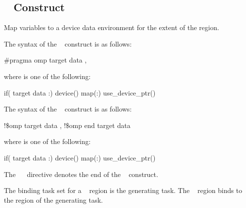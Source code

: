 \subsection{~ Construct}
\label{subsec:target data Construct}
\summary
 Map variables to a device data environment for the extent of the region.
\syntax
\begin{ccppspecific}
The syntax of the ~ construct is as follows:

\begin{boxedcode}
\#pragma omp target data \plc{clause[ [ [},\plc{] clause] ... ] new-line}
\end{boxedcode}

\begin{samepage}
where  is one of the following:

\begin{indentedcodelist}
if(\plc{[} target data :\plc{] scalar-expression})
device()
map(\plc{[[map-type-modifier[,]] map-type}:\plc{ ] list})
use\_device\_ptr()
\end{indentedcodelist}
\end{samepage}
\end{ccppspecific}
\medskip

\begin{fortranspecific}
The syntax of the ~ construct is as follows:

\begin{boxedcode}
!\$omp target data \plc{clause[ [ [},\plc{] clause] ... ]}
!\$omp end target data
\end{boxedcode}

where  is one of the following:

\begin{indentedcodelist}
if(\plc{[} target data :\plc{] scalar-logical-expression})
device()
map(\plc{[[map-type-modifier[,]] map-type}:\plc{ ] list})
use\_device\_ptr()
\end{indentedcodelist}

The ~~ directive denotes the end of the ~ construct.
\end{fortranspecific}

\binding
The binding task set for a ~ region is the generating task. The 
~ region binds to the region of the generating task.

